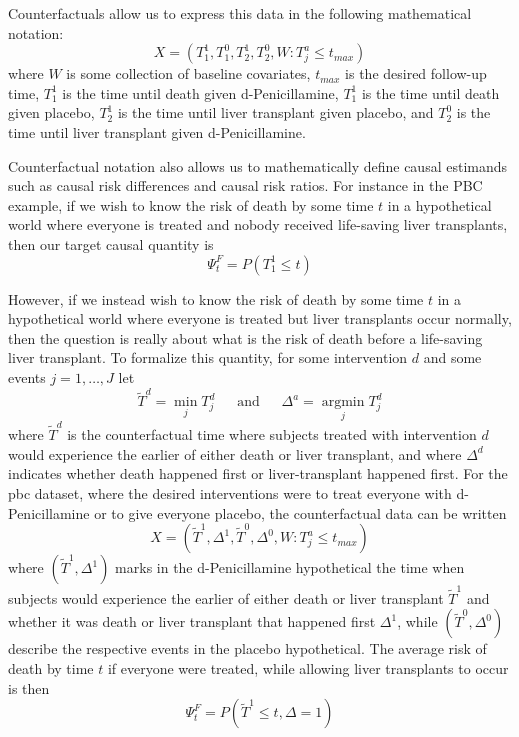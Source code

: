 \documentclass{report}
\DeclareMathOperator*{\argmin}{argmin}
\newcommand{\1}{\ensuremath{\mathbf{1}}}
\newcommand{\T}{\ensuremath{\widetilde{T}}}
\renewcommand{\L}{\ensuremath{W}}
\begin{document}
Counterfactuals allow us to express this data in the following mathematical notation:
\[ X = (T^1_1, T^0_1, T^1_2, T^0_2, \L : T^a_j \leq t_{max}) \]
where \(\L\) is some collection of baseline covariates, \(t_{max}\) is the desired follow-up time, \(T^1_1\) is the time until death given d-Penicillamine, \(T^1_1\) is the time until death given placebo, \(T^1_2\) is the time until liver transplant given placebo, and \(T^0_2\) is the time until liver transplant given d-Penicillamine.

Counterfactual notation also allows us to mathematically define causal estimands such as causal risk differences and causal risk ratios. For instance in the PBC example, if we wish to know the risk of death by some time \(t\) in a hypothetical world where everyone is treated and nobody received life-saving liver transplants, then our target causal quantity is
\begin{equation}
 \Psi^F_t = P(T^1_1 \leq t) \label{survcausalestimand}
\end{equation}

However, if we instead wish to know the risk of death by some time \(t\) in a hypothetical world where everyone is treated but liver transplants occur normally, then the question is really about what is the risk of death before a life-saving liver transplant. To formalize this quantity, for some intervention \(d\) and some events \(j = 1,\dots, J\) let
\[ \T^d = \min\limits_{j} T^d_j \;\;\quad \text{and} \quad \;\; \Delta^a = \argmin\limits_{j} T^d_j \]
where \(\T^d\) is the counterfactual time where subjects treated with intervention \(d\) would experience the earlier of either death or liver transplant, and where \(\Delta^d\) indicates whether death happened first or liver-transplant happened first.
For the pbc dataset, where the desired interventions were to treat everyone with d-Penicillamine or to give everyone placebo, the counterfactual data can be written
\[ X = (\T^1, \Delta^1, \T^0, \Delta^0, \L : T^a_j \leq t_{max}) \]
where \((\T^1, \Delta^1)\) marks in the d-Penicillamine hypothetical the time when subjects would experience the earlier of either death or liver transplant \(\T^1\) and whether it was death or liver transplant that happened first \(\Delta^1\), while \((\T^0, \Delta^0)\) describe the respective events in the placebo hypothetical. The average risk of death by time \(t\) if everyone were treated, while allowing liver transplants to occur is then
\begin{equation*}
 \Psi^F_t = P(\T^1 \leq t, \Delta = 1)
 \label{compriskcausalestimand}
\end{equation*}
\end{document}
